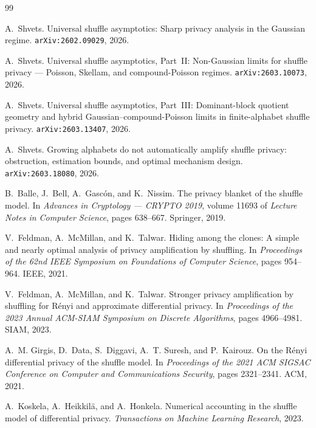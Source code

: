 \documentclass[11pt]{amsart}
\theoremstyle{definition}
\begin{document}
\begin{thebibliography}{99}

A.~Shvets.
\newblock Universal shuffle asymptotics: Sharp privacy analysis in the Gaussian regime.
\newblock \texttt{arXiv:2602.09029}, 2026.

A.~Shvets.
\newblock Universal shuffle asymptotics, Part~II: Non-Gaussian limits for shuffle privacy --- Poisson, Skellam, and compound-Poisson regimes.
\newblock \texttt{arXiv:2603.10073}, 2026.

A.~Shvets.
\newblock Universal shuffle asymptotics, Part~III: Dominant-block quotient geometry and hybrid Gaussian--compound-Poisson limits in finite-alphabet shuffle privacy.
\newblock \texttt{arXiv:2603.13407}, 2026.

A.~Shvets.
\newblock Growing alphabets do not automatically amplify shuffle privacy: obstruction, estimation bounds, and optimal mechanism design.
\newblock \texttt{arXiv:2603.18080}, 2026.

B.~Balle, J.~Bell, A.~Gasc\'on, and K.~Nissim.
\newblock The privacy blanket of the shuffle model.
\newblock In \emph{Advances in Cryptology --- CRYPTO 2019}, volume 11693 of \emph{Lecture Notes in Computer Science}, pages 638--667. Springer, 2019.

V.~Feldman, A.~McMillan, and K.~Talwar.
\newblock Hiding among the clones: A simple and nearly optimal analysis of privacy amplification by shuffling.
\newblock In \emph{Proceedings of the 62nd IEEE Symposium on Foundations of Computer Science}, pages 954--964. IEEE, 2021.

V.~Feldman, A.~McMillan, and K.~Talwar.
\newblock Stronger privacy amplification by shuffling for R\'enyi and approximate differential privacy.
\newblock In \emph{Proceedings of the 2023 Annual ACM-SIAM Symposium on Discrete Algorithms}, pages 4966--4981. SIAM, 2023.

A.~M. Girgis, D.~Data, S.~Diggavi, A.~T. Suresh, and P.~Kairouz.
\newblock On the R\'enyi differential privacy of the shuffle model.
\newblock In \emph{Proceedings of the 2021 ACM SIGSAC Conference on Computer and Communications Security}, pages 2321--2341. ACM, 2021.

A.~Koskela, A.~Heikkil\"a, and A.~Honkela.
\newblock Numerical accounting in the shuffle model of differential privacy.
\newblock \emph{Transactions on Machine Learning Research}, 2023.


\end{thebibliography}
\end{document}
